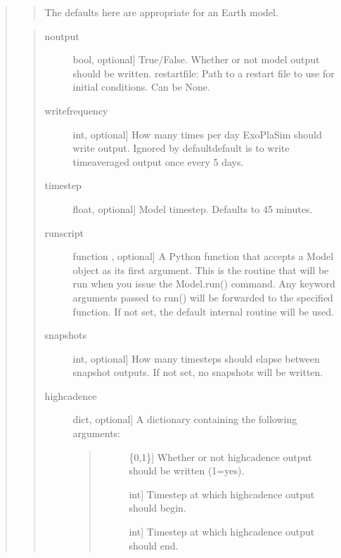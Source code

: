 \documentclass[letterpaper,10pt,english]{sphinxmanual}
\begin{document}
\begin{fulllineitems}
\begin{fulllineitems}
\begin{quote}
\begin{quote}
The defaults here are appropriate for an Earth model.
\end{quote}

\begin{quote}
\begin{description}
\item[{noutput}] \leavevmode{[}bool, optional{]}
True/False. Whether or not model output should be written.
restartfile: Path to a restart file to use for initial conditions. Can be None.

\item[{writefrequency}] \leavevmode{[}int, optional{]}
How many times per day ExoPlaSim should write output. Ignored by
default\textendash{}default is to write time\sphinxhyphen{}averaged output once every 5 days.

\item[{timestep}] \leavevmode{[}float, optional{]}
Model timestep. Defaults to 45 minutes.

\item[{runscript}] \leavevmode{[}function , optional{]}
A Python function that accepts a Model object as its first argument. This
is the routine that will be run when you issue the Model.run() command.
Any keyword arguments passed to run() will be forwarded to the specified
function. If not set, the default internal routine will be used.

\item[{snapshots}] \leavevmode{[}int, optional{]}
How many timesteps should elapse between snapshot outputs. If not set,
no snapshots will be written.

\item[{highcadence}] \leavevmode{[}dict, optional{]}
A dictionary containing the following arguments:
\begin{quote}
\begin{description}
\item[{}] \leavevmode{[}\{0,1\}{]}
Whether or not high\sphinxhyphen{}cadence output should be written (1=yes).

\item[{}] \leavevmode{[}int{]}
Timestep at which high\sphinxhyphen{}cadence output should begin.

\item[{}] \leavevmode{[}int{]}
Timestep at which high\sphinxhyphen{}cadence output should end.


\end{description}
\end{quote}
\end{description}
\end{quote}
\end{quote}
\end{fulllineitems}
\end{fulllineitems}
\end{document}
